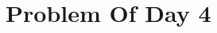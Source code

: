 \documentclass{article}
\newcommand{\YearPath}{../../../LatexConfig} %
\newcommand{\SemesterPath}{../../LatexConfig} %
\newcommand{\ClassPath}{../LatexConfig} %
\begin{document}




\section{Problem Of Day 4}

\end{document}
